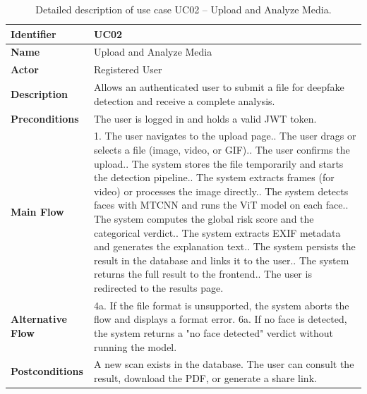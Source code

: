 \begin{table}[H]
\centering
\renewcommand{\arraystretch}{1.3}
\begin{tabular}{|p{3.5cm}|p{10cm}|}
\hline
\textbf{Identifier} & UC02 \\
\hline
\textbf{Name} & Upload and Analyze Media \\
\hline
\textbf{Actor} & Registered User \\
\hline
\textbf{Description} & Allows an authenticated user to submit a file for deepfake detection and receive a complete analysis. \\
\hline
\textbf{Preconditions} & The user is logged in and holds a valid JWT token. \\
\hline
\textbf{Main Flow} & 
1. The user navigates to the upload page.\newline
2. The user drags or selects a file (image, video, or GIF).\newline
3. The user confirms the upload.\newline
4. The system stores the file temporarily and starts the detection pipeline.\newline
5. The system extracts frames (for video) or processes the image directly.\newline
6. The system detects faces with MTCNN and runs the ViT model on each face.\newline
7. The system computes the global risk score and the categorical verdict.\newline
8. The system extracts EXIF metadata and generates the explanation text.\newline
9. The system persists the result in the database and links it to the user.\newline
10. The system returns the full result to the frontend.\newline
11. The user is redirected to the results page. \\
\hline
\textbf{Alternative Flow} & 
4a. If the file format is unsupported, the system aborts the flow and displays a format error.\newline
6a. If no face is detected, the system returns a "no face detected" verdict without running the model. \\
\hline
\textbf{Postconditions} & A new scan exists in the database. The user can consult the result, download the PDF, or generate a share link. \\
\hline
\end{tabular}
\caption{Detailed description of use case UC02 -- Upload and Analyze Media.}
\label{tab:uc02}
\end{table}

